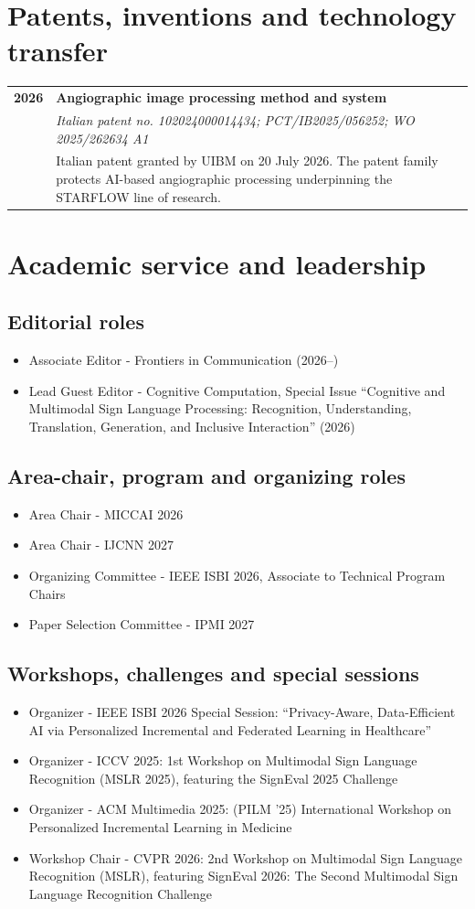 \documentclass[10pt,a4paper]{article}
\makeatletter
\newcommand{\cvrole}[4]{%
\begin{tabularx}{\linewidth}{@{}>{\raggedright\arraybackslash}p{26mm}X@{}}
\textcolor{GoldAccent}{\textbf{#1}} &
\textbf{\color{Navy}#2}\\[-1pt]
& \textit{#3}\\[-1pt]
& \color{BodyGrey}#4
\end{tabularx}\vspace{3pt}}
\makeatother
\begin{document}
\section{Patents, inventions and technology transfer}
\cvrole{2026}{Angiographic image processing method and system}{Italian patent no. 102024000014434; PCT/IB2025/056252; WO 2025/262634 A1}{Italian patent granted by UIBM on 20 July 2026. The patent family protects AI-based angiographic processing underpinning the STARFLOW line of research.}

\section{Academic service and leadership}
\subsection{Editorial roles}
\begin{itemize}
\item Associate Editor - Frontiers in Communication (2026–)
\item Lead Guest Editor - Cognitive Computation, Special Issue “Cognitive and Multimodal Sign Language Processing: Recognition, Understanding, Translation, Generation, and Inclusive Interaction” (2026)
\end{itemize}
\subsection{Area-chair, program and organizing roles}
\begin{itemize}
\item Area Chair - MICCAI 2026
\item Area Chair - IJCNN 2027
\item Organizing Committee - IEEE ISBI 2026, Associate to Technical Program Chairs
\item Paper Selection Committee - IPMI 2027
\end{itemize}
\subsection{Workshops, challenges and special sessions}
\begin{itemize}
\item Organizer - IEEE ISBI 2026 Special Session: “Privacy-Aware, Data-Efficient AI via Personalized Incremental and Federated Learning in Healthcare”
\item Organizer - ICCV 2025: 1st Workshop on Multimodal Sign Language Recognition (MSLR 2025), featuring the SignEval 2025 Challenge
\item Organizer - ACM Multimedia 2025: (PILM ’25) International Workshop on Personalized Incremental Learning in Medicine
\item Workshop Chair - CVPR 2026: 2nd Workshop on Multimodal Sign Language Recognition (MSLR), featuring SignEval 2026: The Second Multimodal Sign Language Recognition Challenge
\end{itemize}
\end{document}

